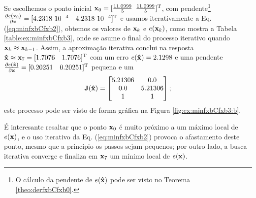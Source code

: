 \begin{SolutionT}
\label{ex:minfxbCfxb3:sol1}
Se escolhemos o ponto inicial $\VECTOR{x}_0=[\frac{11.0999}{5}$ $\frac{11.0999}{5}]^{\mathrm{T}}$,
com pendente\footnote{O cálculo da
pendente de $e(\VECTOR{\hat{x}})$ pode ser visto no Teorema \ref{theo:derfxbCfxb0}.} 
$\frac{\partial e(\VECTOR{x}_0)}{\partial \VECTOR{x} }=[4.2318~10^{-4}\quad 4.2318~10^{-4}]^{\transpose}$ e 
usamos iterativamente a Eq. (\ref{eq:minfxbCfxb2}), obtemos os valores 
de $\VECTOR{x}_k$ e $e(\VECTOR{x}_k)$, como mostra a Tabela \ref{table:ex:minfxbCfxb3},
onde se asume o final do processo iterativo quando $\VECTOR{x}_k \approx \VECTOR{x}_{k-1}$.
Assim, a aproximação iterativa conclui na resposta $\VECTOR{\hat{x}}\approx \VECTOR{x}_{7} =[1.7076\quad 1.7076]^{\transpose}$
com um erro $e(\VECTOR{\hat{x}})=2.1298$ e uma pendente
$\frac{\partial e(\VECTOR{\hat{x}})}{\partial \VECTOR{x} }=[0.20251\quad 0.20251]^{\transpose}$
pequena e um
\begin{equation}
\MATRIX{J}(\VECTOR{\hat{x}})=
\begin{bmatrix}
5.21306 & 0.0\\ 
0.0     & 5.21306\\
1       & 1
\end{bmatrix};
\end{equation}
este processo pode ser visto de forma gráfica na Figura \ref{fig:ex:minfxbCfxb3:b}.

É interesante resaltar que o ponto $\VECTOR{x}_0$ é muito próximo a um máximo local de 
$e(\VECTOR{x})$, e o uso iterativo da Eq. (\ref{eq:minfxbCfxb2}) 
provoca o afastamento deste ponto, mesmo que a principio os passos sejam pequenos;
por outro lado, a busca iterativa converge e finaliza em $\VECTOR{x}_7$ um mínimo local 
de $e(\VECTOR{x})$.

\end{SolutionT}

